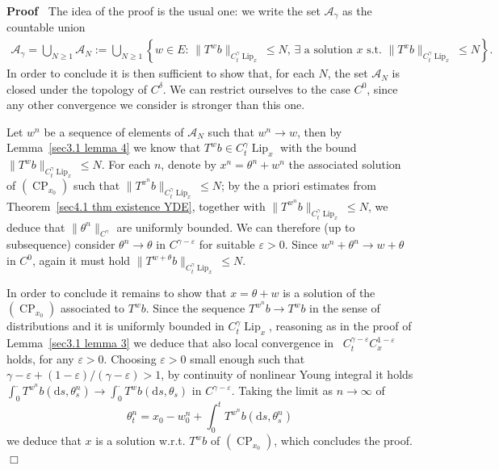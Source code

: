 \documentclass[10pt]{article}
\newcommand{\assign}{:=}
\newcommand{\comma}{{,}}
\newcommand{\mathd}{\mathrm{d}}
\newcommand{\tmop}[1]{\ensuremath{\operatorname{#1}}}
\newenvironment{proof}{\noindent\textbf{Proof\ }}{\hspace*{\fill}$\Box$\medskip}
\begin{document}
\begin{proof}
  The idea of the proof is the usual one: we write the set
  $\mathcal{A}_{\gamma}$ as the countable union
  \begin{align*}
\mathcal{A}_{\gamma} = \bigcup_{N \geqslant 1} \mathcal{A}_N 
\assign \bigcup_{N \geqslant 1} \left\{ w \in E : \, \| T^w b
     \|_{C^{\gamma}_t \tmop{Lip}_x} \leqslant N,\,\exists \text{ a solution
     $x$ s.t. } \| T^x b \|_{C^{\gamma}_t \tmop{Lip}_x} \leqslant N \right\} .
  \end{align*}
%
  In order to conclude it is then sufficient to show that, for each $N$, the
  set $\mathcal{A}_N$ is closed under the topology of $C^{\delta}$. We can
  restrict ourselves to the case $C^0$, since any other convergence we
  consider is stronger than this one.
  
  Let $w^n$ be a sequence of elements of $\mathcal{A}_N$ such that $w^n
  \rightarrow w$, then by Lemma~\ref{sec3.1 lemma 4} we know that $T^w b \in
  C^{\gamma}_t \tmop{Lip}_x$ with the bound $\| T^w b \|_{C^{\gamma}_t
  \tmop{Lip}_x} \leqslant N$. For each $n$, denote by $x^n = \theta^n + w^n$
  the associated solution of $(\tmop{CP}_{x_0})$ such that $\| T^{x^n} b
  \|_{C^{\gamma}_t \tmop{Lip}_x} \leqslant N$; by the a priori estimates from
  Theorem~\ref{sec4.1 thm existence YDE}, together with $\| T^{w^n} b
  \|_{C^{\gamma}_t \tmop{Lip}_x} \leqslant N$, we deduce that $\| \theta^n
  \|_{C^{\gamma}}$ are uniformly bounded. We can therefore (up to subsequence)
  consider $\theta^n \rightarrow \theta$ in $C^{\gamma - \varepsilon}$ for
  suitable $\varepsilon > 0$. Since $w^n + \theta^n \rightarrow w + \theta$ in
  $C^0$, again it must hold $\| T^{w + \theta} b \|_{C^{\gamma}_t
  \tmop{Lip}_x} \leqslant N$.
  
  In order to conclude it remains to show that $x = \theta + w$ is a solution
  of the $(\tmop{CP}_{x_0})$ associated to $T^w b$. Since the sequence
  $T^{w^n} b \rightarrow T^w b$ in the sense of distributions and it is
  uniformly bounded in $C^{\gamma}_t \tmop{Lip}_x$, reasoning as in the proof
  of Lemma~\ref{sec3.1 lemma 3} we deduce that also local convergence in \
  $C^{\gamma - \varepsilon}_t C^{1 - \varepsilon}_x$ holds, for any
  $\varepsilon > 0$. Choosing $\varepsilon > 0$ small enough such that $\gamma
  - \varepsilon + (1 - \varepsilon) / (\gamma - \varepsilon) > 1$, by
  continuity of nonlinear Young integral it holds $\int_0^{\cdot} T^{w^n} b
  (\mathd s, \theta^n_s) \rightarrow \int_0^{\cdot} T^w b (\mathd s,
  \theta_s)$ in $C^{\gamma - \varepsilon}$. Taking the limit as $n \rightarrow
  \infty$ of
  \[ \theta^n_t = x_0 - w^n_0 + \int_0^t T^{w^n} b (\mathd s \comma
     \theta^n_s) \]
  we deduce that $x$ is a solution w.r.t. $T^w b$ of $(\tmop{CP}_{x_0})$,
  which concludes the proof.
\end{proof}
\end{document}
